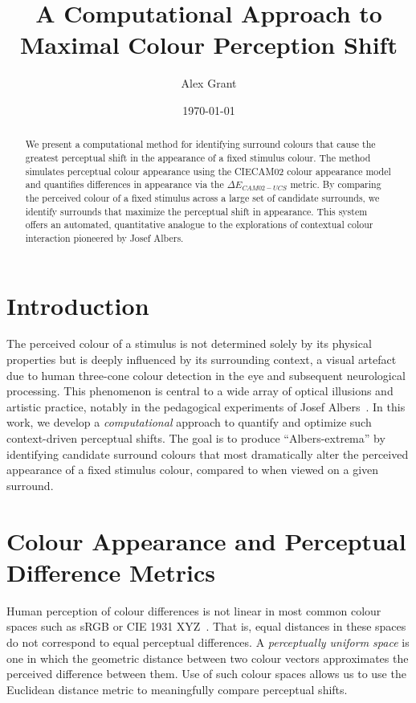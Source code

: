 \documentclass[11pt]{article}
\title{A Computational Approach to Maximal Colour Perception Shift}
\author{Alex Grant}
\affil{Improbability Engineering}
\date{\today}
\begin{document}
\maketitle

\begin{abstract}
We present a computational method for identifying surround colours that cause the greatest perceptual shift in the appearance of a fixed stimulus colour. The method simulates perceptual colour appearance using the CIECAM02 colour appearance model and quantifies differences in appearance via the $\Delta E_{CAM02-UCS}$ metric. By comparing the perceived colour of a fixed stimulus across a large set of candidate surrounds, we identify surrounds that maximize the perceptual shift in appearance. This system offers an automated, quantitative analogue to the explorations of contextual colour interaction pioneered by Josef Albers.
\end{abstract}

\section{Introduction}

The perceived colour of a stimulus is not determined solely by its physical properties but is deeply influenced by its surrounding context, a visual artefact due to human three-cone colour detection in the eye and subsequent neurological processing. This phenomenon is central to a wide array of optical illusions and artistic practice, notably in the pedagogical experiments of Josef Albers~\cite{albers}. In this work, we develop a \emph{computational} approach to quantify and optimize such context-driven perceptual shifts. The goal is to produce ``Albers-extrema'' by identifying candidate surround colours that most dramatically alter the perceived appearance of a fixed stimulus colour, compared to when viewed on a given surround.

\section{Colour Appearance and Perceptual Difference Metrics}

Human perception of colour differences is not linear in most common colour spaces such as sRGB or CIE 1931 XYZ~\cite{cam02}. That is, equal distances in these spaces do not correspond to equal perceptual differences. A \textit{perceptually uniform space} is one in which the geometric distance between two colour vectors approximates the perceived difference between them. Use of such colour spaces allows us to use the Euclidean distance metric to meaningfully compare perceptual shifts.
\end{document}

